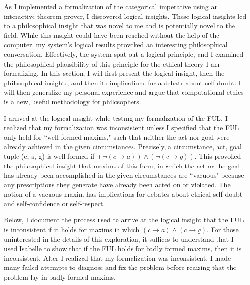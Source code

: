 \begin{isabellebody}
%
\isadelimdocument
%
\endisadelimdocument
%
\isatagdocument
%
\isamarkuptrue%
%
\endisatagdocument
{\isafolddocument}%
%
\isadelimdocument
%
\endisadelimdocument
%
\begin{isamarkuptext}%
As I implemented a formalization of the categorical imperative using an interactive theorem prover, 
I discovered logical insights. These logical insights led to a philosophical 
insight that was novel to me and is potentially novel to the field.  While this 
insight could have been reached without the help of the computer, my system's logical results provoked
an interesting philosophical conversation. Effectively, the system spat out a logical principle, and 
I examined the philosophical plausibility of this principle for the ethical 
theory I am formalizing. In this section, I will first present the logical insight, then the 
philosophical insights, and then its implications for a debate about self-doubt. I will then
generalize my personal experience and argue that computational ethics is a new, useful methodology 
for philosophers.

I arrived at the logical insight while testing my formalization of the FUL. I realized
that my formalization was inconsistent unless I specified that the FUL only held for ``well-formed maxims,"
such that neither the act nor goal were already achieved in the given circumstances. Precisely, 
a circumstance, act, goal tuple (c, a, g) is well-formed if $(\neg (c \longrightarrow a) ) \wedge 
(\neg(c \longrightarrow g))$. This provoked the philosophical insight that maxims of this form, in which 
the act or the goal has already been accomplished in the given circumstances are ``vacuous" because 
any prescriptions they generate have already been acted on or violated. The notion of a vacuous maxim
has implications for debates about ethical self-doubt and self-confidence or self-respect.

Below, I document the process used to arrive at the logical insight that the FUL is inconsistent if it
holds for maxims in which $(c \longrightarrow a) \wedge (c \longrightarrow g)$. For those uninterested
in the details of this exploration, it suffices to understand that I used Isabelle to show that if the 
FUL holds for badly formed maxims, then it is inconsistent. After I realized that my formalization was 
inconsistent, I made many failed attempts to diagnose and fix the problem before reaizing that the problem 
lay in badly formed maxims. 


\end{isamarkuptext}
\end{isabellebody}
